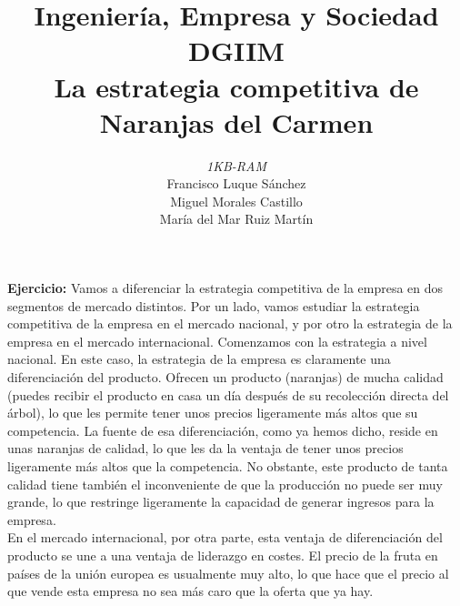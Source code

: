 \documentclass[11pt]{article}
\theoremstyle{plain}
\theoremstyle{definition}
\begin{document}
\title{Ingeniería, Empresa y Sociedad \\
  DGIIM \\
  \large La estrategia competitiva de Naranjas del Carmen}
\author{\textit{1KB-RAM}\\
  Francisco Luque Sánchez\\
  Miguel Morales Castillo\\
  María del Mar Ruiz Martín}

\maketitle

\textbf{Ejercicio:} Vamos a diferenciar la estrategia competitiva de
la empresa en dos segmentos de mercado distintos. Por un lado, vamos
estudiar la estrategia competitiva de la empresa en el mercado
nacional, y por otro la estrategia de la empresa en el mercado
internacional. Comenzamos con la estrategia a nivel nacional. En este
caso, la estrategia de la empresa es claramente una diferenciación del
producto. Ofrecen un producto (naranjas) de mucha calidad (puedes
recibir el producto en casa un día después de su recolección directa
del árbol), lo que les permite tener unos precios ligeramente más
altos que su competencia. La fuente de esa diferenciación, como ya
hemos dicho, reside en unas naranjas de calidad, lo que les da la
ventaja de tener unos precios ligeramente más altos que la
competencia.  No obstante, este producto de tanta calidad tiene
también el inconveniente de que la producción no puede ser muy grande,
lo que restringe ligeramente la capacidad de generar ingresos para
la empresa.\\

En el mercado internacional, por otra parte, esta ventaja de
diferenciación del producto se une a una ventaja de liderazgo en
costes. El precio de la fruta en países de la unión europea es
usualmente muy alto, lo que hace que el precio al que vende esta
empresa no sea más caro que la oferta que ya hay.\\
\end{document}
